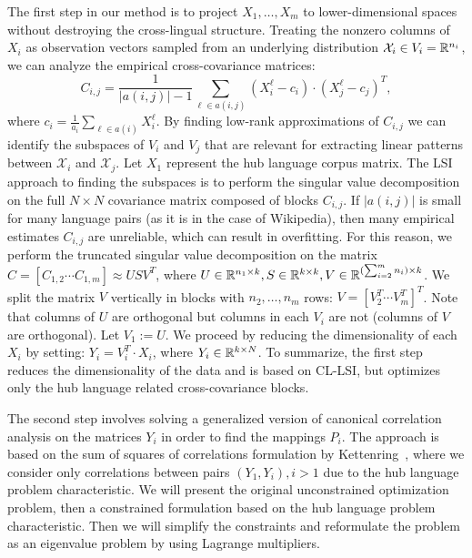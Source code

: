 The first step in our method is to project $X_1, \ldots, X_m$ to lower-dimensional spaces
without destroying the cross-lingual structure. Treating the nonzero columns of $X_i$ as
observation vectors sampled from an underlying distribution $\mathcal{X}_i \in V_i = \mathbb{R}^{n_i}$,
we can analyze the empirical cross-covariance matrices:
$$C_{i,j} = \frac{1}{|a(i,j)|-1 }\sum_{\ell \in a(i,j)} (X_i^{\ell} - c_i)\cdot (X_j^{\ell} - c_j)^T,$$
where $c_i = \frac{1}{a_i} \sum_{\ell \in a(i)}X_i^{\ell}$. By finding low-rank
approximations of $C_{i,j}$ we can identify the subspaces of $V_i$ and $V_j$ that are
relevant for extracting linear patterns between $\mathcal{X}_i$ and $\mathcal{X}_j$.
Let $X_1$ represent the hub language corpus matrix. The LSI approach to finding the subspaces
is to perform the singular value decomposition on the full $N \times N$ covariance matrix
composed of blocks $C_{i,j}$. If $|a(i,j)|$ is small for many language pairs (as it is in the
case of Wikipedia), then many empirical estimates $C_{i,j}$ are unreliable, which can result
in overfitting. For this reason, we perform the truncated singular value decomposition on the
matrix $C = [C_{1,2}  \cdots  C_{1,m}] \approx U S V^T$, where
$U \in \mathbb{R}^{n_1 \times k}, S \in \mathbb{R}^{k \times k}, V \in \mathbb{R}^{(\sum_{i=2}^m n_i) \times k}$.
We split the matrix $V$ vertically in blocks with
$n_2, \ldots, n_m$ rows: $V = [V_2^T  \cdots  V_m^T]^T$.
Note that columns of $U$ are orthogonal but columns in each $V_i$ are not (columns of $V$
are orthogonal). Let $V_1 := U$. We proceed by reducing the dimensionality of each $X_i$ by
setting: $Y_i = V_i^T \cdot X_i$, where $Y_i \in \mathbb{R}^{k\times N}$. To summarize, the first step
reduces the dimensionality of the data and is based on CL-LSI, but optimizes only the hub language
related cross-covariance blocks.

The second step involves solving a generalized version of canonical correlation analysis on the
matrices $Y_i$ in order to find the mappings $P_i$. The approach is based on the sum of
squares of correlations formulation by Kettenring~\cite{Kettenring}, where we consider only
correlations between pairs $(Y_1, Y_i), i >1$ due to the hub language problem characteristic.
We will present the original unconstrained optimization problem, then a constrained formulation
based on the hub language problem characteristic. Then we will simplify the constraints and
reformulate the problem as an eigenvalue problem by using Lagrange multipliers.


